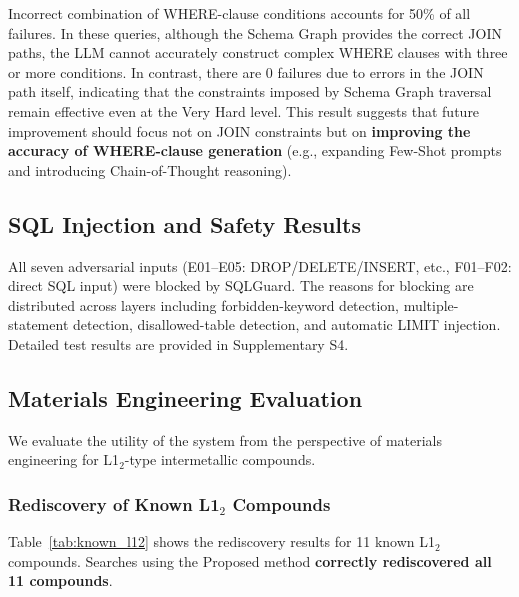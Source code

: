 \documentclass[5p,twocolumn]{elsarticle}
\begin{document}
Incorrect combination of WHERE-clause conditions accounts for 50\% of all failures.
In these queries, although the Schema Graph provides the correct JOIN paths,
the LLM cannot accurately construct complex WHERE clauses with three or more conditions.
In contrast, there are 0 failures due to errors in the JOIN path itself,
indicating that the constraints imposed by Schema Graph traversal remain effective even at the Very Hard level.
This result suggests that future improvement should focus not on JOIN constraints but on \textbf{improving the accuracy of WHERE-clause generation}
(e.g., expanding Few-Shot prompts and introducing Chain-of-Thought reasoning).

\subsection{SQL Injection and Safety Results}

All seven adversarial inputs (E01--E05: DROP/DELETE/INSERT, etc.,
F01--F02: direct SQL input) were blocked by SQLGuard.
The reasons for blocking are distributed across layers including forbidden-keyword detection, multiple-statement detection, disallowed-table detection,
and automatic LIMIT injection.
Detailed test results are provided in Supplementary S4.

\subsection{Materials Engineering Evaluation}
\label{sec:materials_evaluation}

We evaluate the utility of the system from the perspective of materials engineering for L1$_2$-type intermetallic compounds.

\subsubsection{Rediscovery of Known L1$_2$ Compounds}

Table~\ref{tab:known_l12} shows the rediscovery results for 11 known L1$_2$ compounds.
Searches using the Proposed method \textbf{correctly rediscovered all 11 compounds}.
\end{document}
